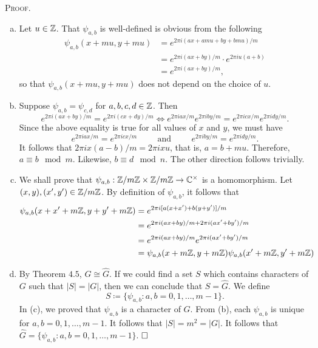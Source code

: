 \documentclass[11pt, leqno]{article}
\newcommand{\done}{\ensuremath{\hfill\square}}
\begin{document}
\textsc{Proof}.
\begin{enumerate}[(a)]
\item Let $u \in \mathbb{Z}$. That $\psi_{a,b}$ is well-defined is obvious from the following 
\begin{align*}
  \psi_{a,b}(x+mu, y + mu) &= e^{2\pi i (ax + amu + by + bmu)/m} \\
                           &= e^{2\pi i(ax+by)/m}\cdot e^{2\pi iu(a+b)} \\
                           &= e^{2\pi i(ax+by)/m},
\end{align*}
so that $\psi_{a,b}(x+mu, y+mu)$ does not depend on the choice of $u$. 
\item Suppose $\psi_{a,b} = \psi_{c,d}$ for $a, b, c, d \in \mathbb{Z}$. Then
\begin{displaymath}
e^{2\pi i (ax+by)/m} = e^{2\pi i (cx+dy)/m} \iff e^{2\pi i ax/m} e^{2\pi i by/m} = e^{2\pi i cx/m} e^{2\pi i dy/m}.
\end{displaymath}
Since the above equality is true for all values of $x$ and $y$, we must have 
\begin{displaymath}
e^{2\pi i ax/m} = e^{2\pi i cx/m} \hspace{1cm} \text{and} \hspace{1cm} e^{2\pi i by/m} = e^{2\pi i dy/m}.
\end{displaymath}
It follows that $2\pi i x (a-b)/m = 2\pi i x u$, that is, $a = b + mu$. Therefore, $a \equiv b \mod m$. Likewise, $b \equiv d \mod n$. The other direction follows trivially. 
\item We shall prove that $\psi_{a,b}: \mathbb{Z}/m\mathbb{Z} \times \mathbb{Z}/m\mathbb{Z} \to \mathbb{C}^{\times}$ is a homomorphism. Let $(x, y), (x^{\prime}, y^{\prime}) \in \mathbb{Z}/m\mathbb{Z}$. By definition of $\psi_{a,b}$, it follows that 
\begin{align*}
  \psi_{a,b}(x+ x^{\prime} + m\mathbb{Z}, y + y^{\prime} + m\mathbb{Z}) &= e^{2\pi i [a(x+x^{\prime}) + b(y+y^{\prime})]/m} \\
                                                        &= e^{2\pi i (ax+by)/m + 2\pi i (ax^{\prime}+by^{\prime})/m} \\
                                                        &= e^{2\pi i (ax+by)/m} e^{2\pi i (ax^{\prime} + by^{\prime})/m} \\
  &= \psi_{a,b}(x + m\mathbb{Z}, y + m\mathbb{Z}) \psi_{a,b} (x^{\prime} + m\mathbb{Z}, y^{\prime} + m\mathbb{Z})
\end{align*} 
\item By Theorem $4.5$, $G \cong \widehat{G}$. If we could find a set $S$ which contains characters of $G$ such that $|S|=|G|$, then we can conclude that $S = \widehat G$. We define 
\begin{displaymath}
S \coloneqq \{ \psi_{a,b} : a, b = 0,1,\ldots, m-1\}.
\end{displaymath}
In (c), we proved that $\psi_{a,b}$ is a character of $G$. From (b), each $\psi_{a,b}$ is unique for $a, b = 0,1,\ldots, m-1$. It follows that $|S|=m^2 = |G|$. It follows that $\widehat{G} = \{ \psi_{a,b}: a,b = 0, 1,\ldots, m-1 \}$. \done
\end{enumerate}
\end{document}
